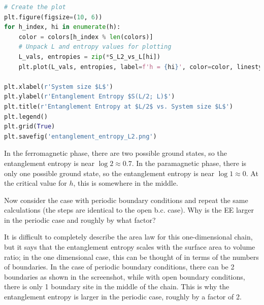 \documentclass[12pt]{article}
\begin{document}
\begin{lstlisting}[language=Python]
# Create the plot
plt.figure(figsize=(10, 6))
for h_index, hi in enumerate(h):
    color = colors[h_index % len(colors)]
    # Unpack L and entropy values for plotting
    L_vals, entropies = zip(*S_L2_vs_L[hi])
    plt.plot(L_vals, entropies, label=f'h = {hi}', color=color, linestyle='-')

plt.xlabel(r'System size $L$')
plt.ylabel(r'Entanglement Entropy $S(L/2; L)$')
plt.title(r'Entanglement Entropy at $L/2$ vs. System size $L$')
plt.legend()
plt.grid(True)
plt.savefig('entanglement_entropy_L2.png')
\end{lstlisting}
In the ferromagnetic phase, there are two possible ground states, so the entanglement entropy is near $\log 2 \approx 0.7$. In the paramagnetic phase, there is only one possible ground state, so the entanglement entropy is near $\log 1 \approx 0$. At the critical value for $h$, this is somewhere in the middle.
\newpage

Now consider the case with periodic boundary conditions and repeat the same calculations (the steps are identical to the open b.c. case). Why is the EE larger in the periodic case and roughly by what factor? 

It is difficult to completely describe the area law for this one-dimensional chain, but it says that the entanglement entropy scales with the surface area to volume ratio; in the one dimensional case, this can be thought of in terms of the numbers of boundaries. In the case of periodic boundary conditions, there can be 2 boundaries as shown in the screenshot, while with open boundary conditions, there is only 1 boundary site in the middle of the chain. This is why the entanglement entropy is larger in the periodic case, roughly by a factor of 2.
\end{document}
